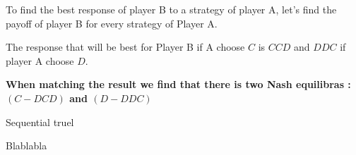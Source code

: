 \documentclass[11pt]{article}
\newenvironment{exercise}[2][Exercise]{\begin{trivlist}
\item[\hskip \labelsep {\bfseries #1}\hskip \labelsep {\bfseries #2.}]}{\end{trivlist}}
\begin{document}
To find the best response of player B to a strategy of player A, let's find the payoff of player B for every strategy of Player A.



The response that will be best for Player B if A choose $C$ is ${CCD}$ and $DDC$ if player A choose $D$. 


\textbf{When matching the result we find that there is two Nash equilibras :
$(C - DCD)$ and $(D - DDC)$ }

\begin{exercise}{3} Sequential truel
\end{exercise}

Blablabla
 

 
 
\end{document}
